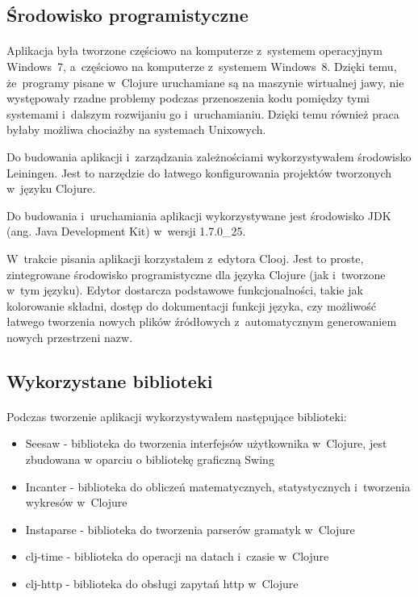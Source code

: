 \subsection{Środowisko programistyczne}

\paragraph{}
Aplikacja była tworzone częściowo na komputerze z~systemem operacyjnym Windows~7, a~częściowo na komputerze z~systemem Windows~8. Dzięki temu, że~programy pisane w~Clojure uruchamiane są na maszynie wirtualnej jawy, nie występowały rzadne problemy podczas przenoszenia kodu pomiędzy tymi systemami i~dalszym rozwijaniu go i~uruchamianiu. Dzięki temu również praca byłaby możliwa chociażby na systemach Unixowych.

Do budowania aplikacji i~zarządzania zależnościami wykorzystywałem środowisko Leiningen\cite{leiningen}. Jest to narzędzie do łatwego konfigurowania projektów tworzonych w~języku Clojure. 

Do budowania i~uruchamiania aplikacji wykorzystywane jest środowisko JDK (ang. Java Development Kit) w~wersji 1.7.0\_25.

W~trakcie pisania aplikacji korzystałem z~edytora Clooj\cite{clooj}. Jest to proste, zintegrowane środowisko programistyczne dla języka Clojure (jak i~tworzone w~tym języku). Edytor dostarcza podstawowe funkcjonalności, takie jak kolorowanie składni, dostęp do dokumentacji funkcji języka, czy możliwość łatwego tworzenia nowych plików źródłowych z~automatycznym generowaniem nowych przestrzeni nazw.

\subsection{Wykorzystane biblioteki}

\paragraph{}
Podczas tworzenie aplikacji wykorzystywałem następujące biblioteki:
\begin{itemize}
	\item Seesaw\cite{seesaw} - biblioteka do tworzenia interfejsów użytkownika w~Clojure, jest zbudowana w oparciu o bibliotekę graficzną Swing
	\item Incanter\cite{incanter} - biblioteka do obliczeń matematycznych, statystycznych i~tworzenia wykresów w~Clojure
	\item Instaparse\cite{instaparse} - biblioteka do tworzenia parserów gramatyk w~Clojure
	\item clj-time\cite{clj-time} - biblioteka do operacji na datach i~czasie w~Clojure
	\item clj-http\cite{clj-http} - biblioteka do obsługi zapytań http w~Clojure
\end{itemize}

